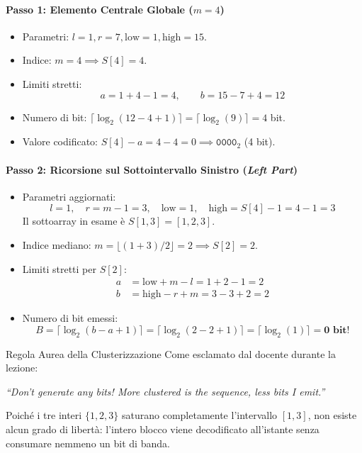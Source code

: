 \paragraph{Passo 1: Elemento Centrale Globale ($m = 4$)}
\begin{itemize}
  \item Parametri: $l = 1, r = 7, \text{low} = 1, \text{high} = 15$.
  \item Indice: $m = 4 \implies S[4] = 4$.
  \item Limiti stretti:
  \begin{equation*}
    a = 1 + 4 - 1 = 4, \qquad b = 15 - 7 + 4 = 12
  \end{equation*}
  \item Numero di bit: $\lceil \log_2(12 - 4 + 1) \rceil = \lceil \log_2(9) \rceil = 4$ bit.
  \item Valore codificato: $S[4] - a = 4 - 4 = 0 \implies \texttt{0000}_2$ (4 bit).
\end{itemize}

\paragraph{Passo 2: Ricorsione sul Sottointervallo Sinistro (\textit{Left Part})}
\begin{itemize}
  \item Parametri aggiornati:
  \begin{equation*}
    l = 1, \quad r = m - 1 = 3, \quad \text{low} = 1, \quad \text{high} = S[4] - 1 = 4 - 1 = 3
  \end{equation*}
  Il sottoarray in esame \`e $S[1, 3] = [1, 2, 3]$.
  \item Indice mediano: $m = \lfloor (1 + 3)/2 \rfloor = 2 \implies S[2] = 2$.
  \item Limiti stretti per $S[2]$:
  \begin{align*}
    a &= \text{low} + m - l = 1 + 2 - 1 = 2 \\
    b &= \text{high} - r + m = 3 - 3 + 2 = 2
  \end{align*}
  \item Numero di bit emessi:
  \begin{equation*}
    B = \lceil \log_2(b - a + 1) \rceil = \lceil \log_2(2 - 2 + 1) \rceil = \lceil \log_2(1) \rceil = \mathbf{0 \text{ bit!}}
  \end{equation*}
\end{itemize}

\begin{noteblock}{Regola Aurea della Clusterizzazione}
Come esclamato dal docente durante la lezione:
\begin{center}
  \textit{``Don't generate any bits! More clustered is the sequence, less bits I emit.''}
\end{center}
Poich\'e i tre interi $\{1, 2, 3\}$ saturano completamente l'intervallo $[1, 3]$, non esiste alcun grado di libert\`a: l'intero blocco viene decodificato all'istante senza consumare nemmeno un bit di banda.
\end{noteblock}

